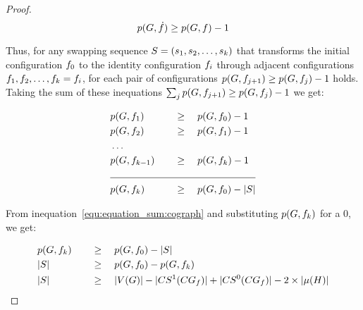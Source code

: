 \documentclass[msc,english,table,xcdraw]{ppgccufmg}
\begin{document}
\begin{proof}
\begin{equation}
    \centering
    \label{equ:decrease_by_one:cograph}
    \applyFunc{p}{\graphG, \sub{\mapFunc}} \geq \applyFunc{p}{\graphG, \mapFunc} - 1
\end{equation}

Thus, for any swapping sequence $S = (s_1, s_2, \ldots, 
s_k)$ that transforms the initial configuration $f_{0}$ to the identity
configuration $f_{i}$ through adjacent configurations $f_{1}, f_2,
\ldots, f_{k} = f_{i}$, for each pair of configurations $p(G, 
f_{j+1}) \geq p(G, f_{j}) -1$ holds. 
Taking the sum of these inequations $\sum_{j} p(G, f_{j+1}) \geq p(G, f_{j}) -1$ we get:
    
\begin{alignat}{2}
\centering
\label{equ:equation_sum:cograph}
&\applyFunc{p}{\graphG, \mapFunc_{1}}  \quad && \geq \quad \applyFunc{p}{\graphG, \mapFunc_{0}} -1 \nonumber \\
&\applyFunc{p}{\graphG, \mapFunc_{2}} \quad && \geq \quad \applyFunc{p}{\graphG, \mapFunc_{1}} -1 \nonumber \\
&\ldots \nonumber \\
&\applyFunc{p}{\graphG, \mapFunc_{k-1}} \quad && \geq \quad \applyFunc{p}{\graphG, \mapFunc_{k}} -1 \nonumber \\
 \cline{1-4}
&\applyFunc{p}{\graphG, \mapFunc_{k}} \quad && \geq \quad \applyFunc{p}{\graphG, \mapFunc_{0}} - \sizeof{\swapSeq}
\end{alignat}
    
From  inequation~\ref{equ:equation_sum:cograph} and substituting $p(G, 
f_{k})$ for a $0$, we get:
    
\begin{alignat}{2}
\centering
\label{equ:lower_bound:cograph}
& \applyFunc{p}{\graphG, \mapFunc_{k}} \quad && \geq \quad \applyFunc{p}{\graphG, \mapFunc_{0}} - \sizeof{\swapSeq} \nonumber \\
&\sizeof{\swapSeq} \quad && \geq \quad \applyFunc{p}{\graphG, \mapFunc_{0}} - \applyFunc{p}{\graphG, \mapFunc_{k}} \nonumber \\
&\sizeof{\swapSeq} \quad && \geq \quad \sizeof{\vertexFunc{\graphG}} - 
\sizeof{\applyFunc{\oneCycles}{\conflictGraph_{\mapFunc}}} +
\sizeof{\applyFunc{\zeroCycles}{\conflictGraph_{\mapFunc}}} - 2\times\sizeof{\matchingOf
{\cycleMatchingGraph}}
\end{alignat}

\end{proof}
\end{document}
